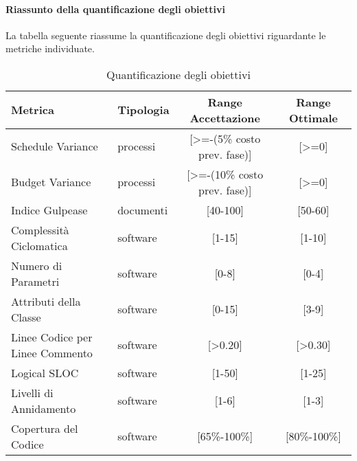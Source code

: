 \paragraph{Riassunto della quantificazione degli obiettivi\\}
\label{riassuntoObiettivi}
La tabella seguente riassume la quantificazione degli obiettivi riguardante le metriche individuate.
\begin{table}[!h]
		\centering
		\begin{tabular}{|l|l|c|c|}
			\hline
			Metrica & Tipologia & Range Accettazione & Range Ottimale\\
			\hline
			Schedule Variance & processi & [>=-(5\% costo prev. fase)]  & [>=0]\\
			Budget Variance & processi &[>=-(10\% costo prev. fase)] & [>=0]\\
			\hline
			Indice Gulpease & documenti & [40-100]&[50-60]\\
			\hline
			Complessità Ciclomatica & software & [1-15]&[1-10]\\
			Numero di Parametri & software & [0-8]&[0-4]\\
			Attributi della Classe & software & [0-15]&[3-9]\\			
			Linee Codice per Linee Commento & software & [>0.20]&[>0.30]\\			
			Logical SLOC & software & [1-50]&[1-25]\\
			Livelli di Annidamento & software & [1-6]&[1-3]\\			
			Copertura del Codice & software & [65\%-100\%]&[80\%-100\%]\\
			\hline			
		\end{tabular}
		\caption{Quantificazione degli obiettivi}
	\end{table}